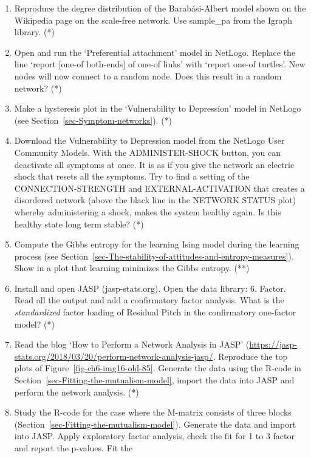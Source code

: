 \documentclass[
  a4paper,
  DIV=11,
  numbers=noendperiod]{scrreprt}
\begin{document}
\begin{enumerate}
\def\labelenumi{\arabic{enumi})}
\item
  Reproduce the degree distribution of the Barabási-Albert model shown
  on the Wikipedia page on the scale-free network. Use sample\_pa from
  the Igraph library. (*)
\item
  Open and run the `Preferential attachment' model in NetLogo. Replace
  the line `report {[}one-of both-ends{]} of one-of links' with `report
  one-of turtles'. New nodes will now connect to a random node. Does
  this result in a random network? (*)
\item
  Make a hysteresis plot in the `Vulnerability to Depression' model in
  NetLogo (see Section~\ref{sec-Symptom-networks}). (*)
\item
  Download the Vulnerability to Depression model from the NetLogo User
  Community Models. With the ADMINISTER-SHOCK button, you can deactivate
  all symptoms at once. It is as if you give the network an electric
  shock that resets all the symptoms. Try to find a setting of the
  CONNECTION-STRENGTH and EXTERNAL-ACTIVATION that creates a disordered
  network (above the black line in the NETWORK STATUS plot) whereby
  administering a shock, makes the system healthy again. Is this healthy
  state long term stable? (*)
\item
  Compute the Gibbs entropy for the learning Ising model during the
  learning process (see
  Section~\ref{sec-The-stability-of-attitudes-and-entropy-measures}).
  Show in a plot that learning minimizes the Gibbs entropy. (**)
\item
  Install and open JASP (jasp-stats.org). Open the data library: 6.
  Factor. Read all the output and add a confirmatory factor analysis.
  What is the \emph{standardized} factor loading of Residual Pitch in
  the confirmatory one-factor model? (*)
\item
  Read the blog `How to Perform a Network Analysis in JASP'
  (\url{https://jasp-stats.org/2018/03/20/perform-network-analysis-jasp/}.
  Reproduce the top plots of Figure~\ref{fig-ch6-img16-old-85}. Generate
  the data using the R-code in
  Section~\ref{sec-Fitting-the-mutualism-model}, import the data into
  JASP and perform the network analysis. (*)
\item
  Study the R-code for the case where the M-matrix consists of three
  blocks (Section~\ref{sec-Fitting-the-mutualism-model}). Generate the
  data and import into JASP. Apply exploratory factor analysis, check
  the fit for 1 to 3 factor and report the p-values. Fit the

\end{enumerate}
\end{document}
